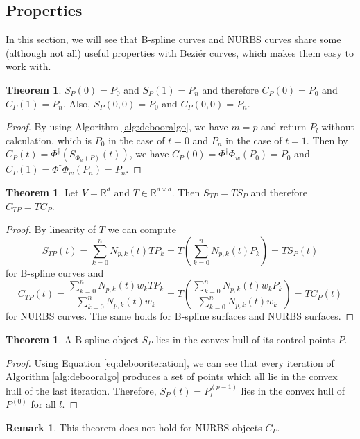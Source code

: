 \documentclass[a4paper, 11pt]{report}
\theoremstyle{definition}
\newtheorem{theorem}[definition]{Theorem}
\newtheorem*{remark}{Remark}
\begin{document}
\subsection{Properties}
In this section, we will see that B-spline curves and NURBS curves share some (although not all) useful properties with Beziér curves, which makes them easy to work with.

\begin{theorem}
	$S_P(0) = P_0$ and $S_P(1) = P_n$ and therefore $C_P(0) = P_0$ and $C_P(1) = P_n$. Also, $S_P(0,0) = P_0$ and $C_P(0,0)=P_n$.
\end{theorem}
\begin{proof}
	By using Algorithm \ref{alg:debooralgo}, we have $m = p$ and return $P_l$ without calculation, which is $P_0$ in the case of $t = 0$ and $P_n$ in the case of $t = 1$. Then by $C_P(t) = \Phi^\dagger(S_{\Phi_w(P)}(t))$, we have $C_P(0) = \Phi^\dagger\Phi_w(P_0) = P_0$ and $C_P(1) = \Phi^\dagger\Phi_w(P_n) = P_n$.
\end{proof}

\begin{theorem}
	Let $V = \mathbb{R}^d$ and $T \in \mathbb{R}^{d \times d}$. Then $S_{TP} = TS_P$ and therefore $C_{TP} = TC_P$.
\end{theorem}
\begin{proof}
	By linearity of $T$ we can compute
		$$S_{TP}(t) = \sum_{k=0}^{n} N_{p,k}(t) TP_k = T \left( \sum_{k=0}^{n} N_{p,k}(t) P_k \right) = TS_P(t)$$
	for B-spline curves and
		$$C_{TP}(t) = \frac{\sum_{k=0}^n N_{p,k}(t) w_k TP_k}{\sum_{k=0}^n N_{p,k}(t) w_k} = T \left( \frac{\sum_{k=0}^n N_{p,k}(t) w_k P_k}{\sum_{k=0}^n N_{p,k}(t) w_k} \right) = TC_P(t)$$
	for NURBS curves. The same holds for B-spline surfaces and NURBS surfaces.
\end{proof}

\begin{theorem}
	A B-spline object $S_P$ lies in the convex hull of its control points $P$.
\end{theorem}
\begin{proof}
	Using Equation \ref{eq:debooriteration}, we can see that every iteration of Algorithm \ref{alg:debooralgo} produces a set of points which all lie in the convex hull of the last iteration. Therefore, $S_P(t) = P^{(p-1)}_l$ lies in the convex hull of $P^{(0)}$ for all $l$.
\end{proof}
\begin{remark}
	This theorem does not hold for NURBS objects $C_P$.
\end{remark}
\end{document}
